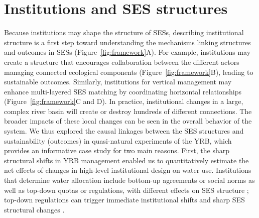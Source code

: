 \documentclass{nsr}
\begin{document}
\section{Institutions and SES structures}
Because institutions may shape the structure of SESs, describing institutional structure is a first step toward understanding the mechanisms linking structures and outcomes in SESs (Figure~\ref{fig:framework}A).
For example, institutions may create a structure that encourages collaboration between the different actors managing connected ecological components (Figure~\ref{fig:framework}B), leading to sustainable outcomes.
Similarly, institutions for vertical management may enhance multi-layered SES matching by coordinating horizontal relationships (Figure~\ref{fig:framework}C and D).
In practice, institutional changes in a large, complex river basin will create or destroy hundreds of different connections. The broader impacts of these local changes can be seen in the overall behavior of the system.
We thus explored the causal linkages between the SES structures and sustainability (outcomes) in quasi-natural experiments of the YRB, which provides an informative case study for two main reasons.
First, the sharp structural shifts in YRB management enabled us to quantitatively estimate the net effects of changes in high-level institutional design on water use. Institutions that determine water allocation include bottom-up agreements or social norms as well as top-down quotas or regulations, with different effects on SES structure \cite{wangAlignmentsocialecological2019,speedBasinwaterallocation2013}; top-down regulations can trigger immediate institutional shifts and sharp SES structural changes \cite{speedBasinwaterallocation2013,rolandUnderstandinginstitutionalchange2004}.
\end{document}
